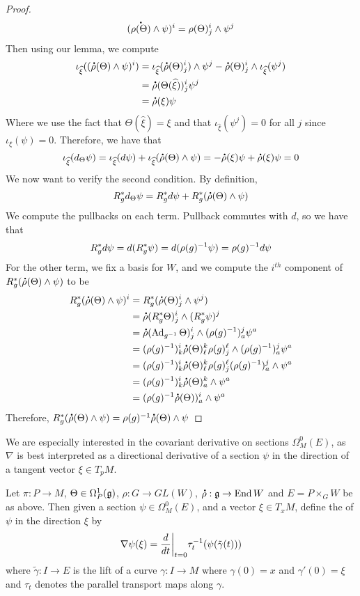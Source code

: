 \begin{proof}
\[
(\accentset{\mbox{\large\bfseries .}}{\rho(\Theta)} \wedge \psi)^i =\rho(\Theta)^i_j \wedge \psi^j
\]
Then using our lemma, we compute
\begin{align*}
\iota_{\widehat{\xi}}((\accentset{\mbox{\large\bfseries .}}{\rho}(\Theta) \wedge \psi)^i) &=
\iota_{\widehat{\xi}}(\accentset{\mbox{\large\bfseries .}}{\rho}(\Theta)^i_j) \wedge \psi^j - \accentset{\mbox{\large\bfseries .}}{\rho}(\Theta)^i_j
\wedge \iota_{\widehat{\xi}}(\psi^j) \\
&= \accentset{\mbox{\large\bfseries .}}{\rho}(\Theta(\widehat{\xi}))^i_j\psi^j \\
&= \accentset{\mbox{\large\bfseries .}}{\rho}(\xi)\psi
\end{align*}
Where we use the fact that $\Theta(\widehat{\xi}) = \xi$ and that
$\iota_{\widehat{\xi}}(\psi^j) = 0$ for all $j$ since $\iota_\xi(\psi) = 0$.
Therefore, we have that
\[
\iota_{\widehat{\xi}}(d_\Theta\psi) = \iota_{\widehat{\xi}}(d\psi) +
\iota_{\widehat{\xi}}(\accentset{\mbox{\large\bfseries .}}{\rho}(\Theta) \wedge \psi) = -\accentset{\mbox{\large\bfseries .}}{\rho}(\xi)\psi
+ \accentset{\mbox{\large\bfseries .}}{\rho}(\xi)\psi = 0
\]
We now want to verify the second condition. By definition,
\[
R_g^*d_\Theta\psi = R_g^*d\psi + R_g^*(\accentset{\mbox{\large\bfseries .}}{\rho}(\Theta) \wedge \psi)
\]
We compute the pullbacks on each term. Pullback commutes with $d$, so we
have that
\[
R_g^*d\psi = d(R^*_g\psi) = d(\rho(g)^{-1}\psi) = \rho(g)^{-1} d\psi
\]
For the other term, we fix a basis for $W$, and we compute
the $i^{th}$ component of $R_g^*(\accentset{\mbox{\large\bfseries .}}{\rho}(\Theta) \wedge \psi)$ to be
\begin{align*}
R_g^*(\accentset{\mbox{\large\bfseries .}}{\rho}(\Theta) \wedge \psi)^i
&= R^*_g(\accentset{\mbox{\large\bfseries .}}{\rho}(\Theta)^i_j \wedge \psi^j) \\
&= \accentset{\mbox{\large\bfseries .}}{\rho}(R_g^*\Theta)^i_j \wedge (R^*_g\psi)^j \\
&= \accentset{\mbox{\large\bfseries .}}{\rho}(\operatorname{Ad}_{g^{-1}}\Theta)^i_j \wedge (\rho(g)^{-1})^j_a\psi^a \\
&= (\rho(g)^{-1})^i_k\accentset{\mbox{\large\bfseries .}}{\rho}(\Theta)^k_\ell\rho(g)^\ell_j
\wedge (\rho(g)^{-1})^j_a\psi^a \\
&= (\rho(g)^{-1})^i_k\accentset{\mbox{\large\bfseries .}}{\rho}(\Theta)^k_\ell\rho(g)^\ell_j(\rho(g)^{-1})^j_a
\wedge \psi^a \\
&= (\rho(g)^{-1})^i_k\accentset{\mbox{\large\bfseries .}}{\rho}(\Theta)^k_a \wedge \psi^a \\
&= (\rho(g)^{-1}\accentset{\mbox{\large\bfseries .}}{\rho}(\Theta))^i_a \wedge \psi^a \\
\end{align*}
Therefore, $R_g^*(\accentset{\mbox{\large\bfseries .}}{\rho}(\Theta) \wedge \psi) =
\rho(g)^{-1} \accentset{\mbox{\large\bfseries .}}{\rho}(\Theta) \wedge \psi$
\end{proof}
%
We are especially interested in the covariant derivative on sections
$\Omega^0_M(E)$, as $\nabla$ is best interpreted as a directional derivative
of a section $\psi$ in the direction of a tangent vector $\xi \in T_pM$.
%
\begin{defn}
Let $\pi : P \to M$, $\Theta \in \Omega^1_P(\mathfrak{g})$, $\rho : G \to GL(W)$,
$\accentset{\mbox{\large\bfseries .}}{\rho} : \mathfrak{g} \to \operatorname{End} W$ and $E = P \times_G W$ be as above. Then given a
section $\psi \in \Omega_M^0(E)$, and a vector $\xi \in T_xM$, define
the  of $\psi$ in the direction $\xi$ by
\[
\nabla\psi(\xi) = \frac{d}{dt}\bigg\vert_{t = 0} \tau_t^{-1}(\psi(\tilde{\gamma}(t)))
\]
where $\tilde{\gamma} : I \to E$ is the lift of a curve $\gamma :I \to M$
where $\gamma(0) = x$ and $\gamma'(0) = \xi$ and $\tau_t$ denotes the parallel
transport maps along $\gamma$.
\end{defn}
